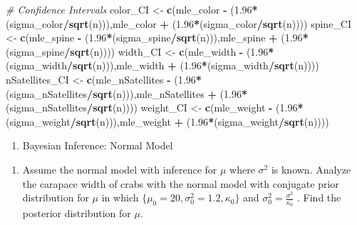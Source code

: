 \documentclass[]{article}
\newenvironment{Shaded}{\begin{snugshade}}{\end{snugshade}}
\newcommand{\KeywordTok}[1]{\textcolor[rgb]{0.13,0.29,0.53}{\textbf{#1}}}
\newcommand{\FloatTok}[1]{\textcolor[rgb]{0.00,0.00,0.81}{#1}}
\newcommand{\StringTok}[1]{\textcolor[rgb]{0.31,0.60,0.02}{#1}}
\newcommand{\CommentTok}[1]{\textcolor[rgb]{0.56,0.35,0.01}{\textit{#1}}}
\newcommand{\OperatorTok}[1]{\textcolor[rgb]{0.81,0.36,0.00}{\textbf{#1}}}
\newcommand{\NormalTok}[1]{#1}
\providecommand{\tightlist}{%
  \setlength{\itemsep}{0pt}\setlength{\parskip}{0pt}}
\begin{document}
\begin{Shaded}
\begin{Highlighting}[]
\CommentTok{# Confidence Intervals }
\NormalTok{color_CI <-}\StringTok{ }\KeywordTok{c}\NormalTok{(mle_color }\OperatorTok{-}\StringTok{ }\NormalTok{(}\FloatTok{1.96}\OperatorTok{*}\NormalTok{(sigma_color}\OperatorTok{/}\KeywordTok{sqrt}\NormalTok{(n))),mle_color }\OperatorTok{+}\StringTok{ }\NormalTok{(}\FloatTok{1.96}\OperatorTok{*}\NormalTok{(sigma_color}\OperatorTok{/}\KeywordTok{sqrt}\NormalTok{(n))))}
\NormalTok{spine_CI <-}\StringTok{ }\KeywordTok{c}\NormalTok{(mle_spine }\OperatorTok{-}\StringTok{ }\NormalTok{(}\FloatTok{1.96}\OperatorTok{*}\NormalTok{(sigma_spine}\OperatorTok{/}\KeywordTok{sqrt}\NormalTok{(n))),mle_spine }\OperatorTok{+}\StringTok{ }\NormalTok{(}\FloatTok{1.96}\OperatorTok{*}\NormalTok{(sigma_spine}\OperatorTok{/}\KeywordTok{sqrt}\NormalTok{(n))))}
\NormalTok{width_CI <-}\StringTok{ }\KeywordTok{c}\NormalTok{(mle_width }\OperatorTok{-}\StringTok{ }\NormalTok{(}\FloatTok{1.96}\OperatorTok{*}\NormalTok{(sigma_width}\OperatorTok{/}\KeywordTok{sqrt}\NormalTok{(n))),mle_width }\OperatorTok{+}\StringTok{ }\NormalTok{(}\FloatTok{1.96}\OperatorTok{*}\NormalTok{(sigma_width}\OperatorTok{/}\KeywordTok{sqrt}\NormalTok{(n))))}
\NormalTok{nSatellites_CI <-}\StringTok{ }\KeywordTok{c}\NormalTok{(mle_nSatellites }\OperatorTok{-}\StringTok{ }\NormalTok{(}\FloatTok{1.96}\OperatorTok{*}\NormalTok{(sigma_nSatellites}\OperatorTok{/}\KeywordTok{sqrt}\NormalTok{(n))),mle_nSatellites }\OperatorTok{+}\StringTok{ }\NormalTok{(}\FloatTok{1.96}\OperatorTok{*}\NormalTok{(sigma_nSatellites}\OperatorTok{/}\KeywordTok{sqrt}\NormalTok{(n))))}
\NormalTok{weight_CI <-}\StringTok{ }\KeywordTok{c}\NormalTok{(mle_weight }\OperatorTok{-}\StringTok{ }\NormalTok{(}\FloatTok{1.96}\OperatorTok{*}\NormalTok{(sigma_weight}\OperatorTok{/}\KeywordTok{sqrt}\NormalTok{(n))),mle_weight }\OperatorTok{+}\StringTok{ }\NormalTok{(}\FloatTok{1.96}\OperatorTok{*}\NormalTok{(sigma_weight}\OperatorTok{/}\KeywordTok{sqrt}\NormalTok{(n))))}
\end{Highlighting}
\end{Shaded}

\begin{enumerate}
\def\labelenumi{\arabic{enumi}.}
\setcounter{enumi}{1}
\tightlist
\item
  Bayesian Inference: Normal Model
\end{enumerate}

\begin{enumerate}
\def\labelenumi{\alph{enumi})}
\tightlist
\item
  Assume the normal model with inference for \(\mu\) where
  \(\sigma^{2}\) is known. Analyze the carapace width of crabs with the
  normal model with conjugate prior distribution for \(\mu\) in which
  \(\{ \mu_0 = 20, \sigma^2_0 = 1.2, \kappa_0 \}\) and
  \(\sigma^2_0 = \frac{\sigma^2}{\kappa_0}\) . Find the posterior
  distribution for \(\mu\).
\end{enumerate}
\end{document}
